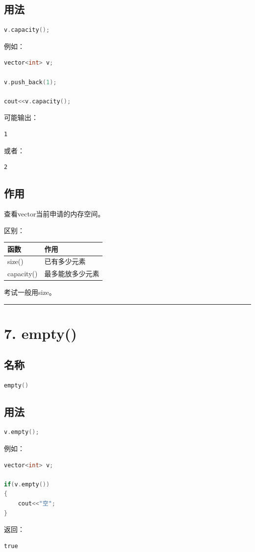 \documentclass[9pt,twocolumn]{extarticle}
\begin{document}
\subsection{用法}
\begin{lstlisting}[language=C++]
v.capacity();
\end{lstlisting}
例如：
\begin{lstlisting}[language=C++]
vector<int> v;

v.push_back(1);

cout<<v.capacity();
\end{lstlisting}
可能输出：
\begin{lstlisting}
1
\end{lstlisting}
或者：
\begin{lstlisting}
2
\end{lstlisting}

\subsection{作用}
查看vector当前申请的内存空间。

区别：
\begin{table}[h]
\centering
\begin{tabular}{|l|l|}
\hline
函数 & 作用 \\ \hline
size() & 已有多少元素 \\ \hline
capacity() & 最多能放多少元素 \\ \hline
\end{tabular}
\end{table}

考试一般用size。

\noindent\rule{\linewidth}{0.4pt}

\section{7. empty()}

\subsection{名称}
\begin{lstlisting}[language=C++]
empty()
\end{lstlisting}

\subsection{用法}
\begin{lstlisting}[language=C++]
v.empty();
\end{lstlisting}
例如：
\begin{lstlisting}[language=C++]
vector<int> v;

if(v.empty())
{
    cout<<"空";
}
\end{lstlisting}
返回：
\begin{lstlisting}
true
\end{lstlisting}
\end{document}
